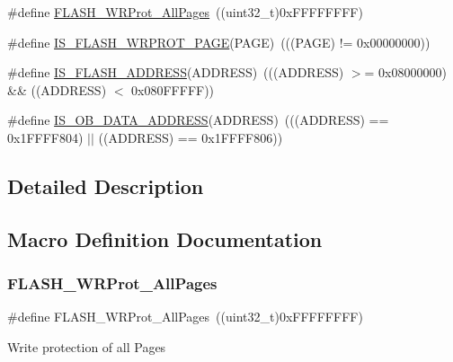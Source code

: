 \begin{DoxyCompactItemize}
\#define \mbox{\hyperlink{group___option___bytes___write___protection_ga6fdaf38a559d606660dd10a411b77ea5}{F\+L\+A\+S\+H\+\_\+\+W\+R\+Prot\+\_\+\+All\+Pages}}~((uint32\+\_\+t)0x\+F\+F\+F\+F\+F\+F\+F\+F)
\item 
\#define \mbox{\hyperlink{group___option___bytes___write___protection_gafe68b93dfb1ebf68d74f871850ab373b}{I\+S\+\_\+\+F\+L\+A\+S\+H\+\_\+\+W\+R\+P\+R\+O\+T\+\_\+\+P\+A\+GE}}(P\+A\+GE)~(((P\+A\+GE) != 0x00000000))
\item 
\#define \mbox{\hyperlink{group___option___bytes___write___protection_gad0c8166ba15a0b8d458412a8bb74e2f0}{I\+S\+\_\+\+F\+L\+A\+S\+H\+\_\+\+A\+D\+D\+R\+E\+SS}}(A\+D\+D\+R\+E\+SS)~(((A\+D\+D\+R\+E\+SS) $>$= 0x08000000) \&\& ((\+A\+D\+D\+R\+E\+S\+S) $<$ 0x080\+F\+F\+F\+F\+F))
\item 
\#define \mbox{\hyperlink{group___option___bytes___write___protection_ga73fcac8d5f301a5c98518374ae926633}{I\+S\+\_\+\+O\+B\+\_\+\+D\+A\+T\+A\+\_\+\+A\+D\+D\+R\+E\+SS}}(A\+D\+D\+R\+E\+SS)~(((A\+D\+D\+R\+E\+SS) == 0x1\+F\+F\+F\+F804) $\vert$$\vert$ ((\+A\+D\+D\+R\+E\+S\+S) == 0x1\+F\+F\+F\+F806))
\end{DoxyCompactItemize}


\subsection{Detailed Description}


\subsection{Macro Definition Documentation}
\mbox{\label{group___option___bytes___write___protection_ga6fdaf38a559d606660dd10a411b77ea5}} 
\subsubsection{\texorpdfstring{FLASH\_WRProt\_AllPages}{FLASH\_WRProt\_AllPages}}
{\footnotesize\ttfamily \#define F\+L\+A\+S\+H\+\_\+\+W\+R\+Prot\+\_\+\+All\+Pages~((uint32\+\_\+t)0x\+F\+F\+F\+F\+F\+F\+F\+F)}

Write protection of all Pages \mbox{\label{group___option___bytes___write___protection_ga7dfbb58b90b63afef11bfcf7a8f109e2}} 
